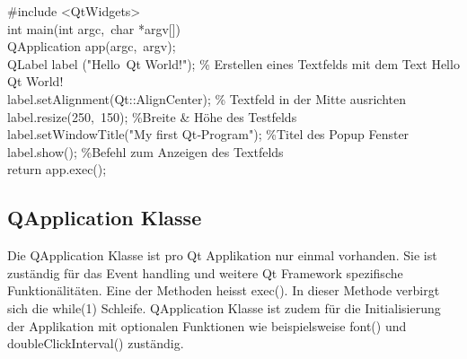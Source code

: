 \#include <QtWidgets> \\
int main(int argc, char *argv[]) \\
{	QApplication app(argc, argv); \\
	QLabel label ("Hello Qt World!"); \% Erstellen eines Textfelds mit dem Text Hello Qt World! \\
 	label.setAlignment(Qt::AlignCenter); \% Textfeld in der Mitte ausrichten \\
	label.resize(250, 150); \%Breite \& Höhe des Testfelds \\
	label.setWindowTitle("My first Qt‐Program"); \%Titel des Popup Fenster  \\
	label.show(); \%Befehl zum Anzeigen des Textfelds \\
	return app.exec(); } 

\subsection{QApplication Klasse}
Die QApplication Klasse ist pro Qt Applikation nur einmal vorhanden. Sie ist zuständig für das Event handling und weitere Qt Framework spezifische Funktionälitäten. Eine der Methoden heisst exec(). In dieser Methode verbirgt sich die while(1) Schleife.
QApplication Klasse ist zudem für die Initialisierung der Applikation mit optionalen Funktionen wie beispielsweise font() und doubleClickInterval() zuständig. 

